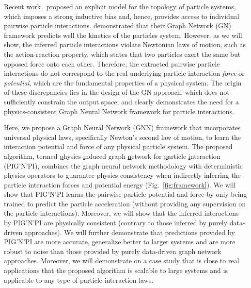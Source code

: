 \documentclass{article}
\newcommand{\pignpi}{PIG'N'PI\xspace}
\begin{document}
Recent work~\cite{cranmer2020discovering} proposed an explicit model for the topology of particle systems, which imposes a strong inductive bias and, hence, provides access to individual pairwise particle interactions. \cite{cranmer2020discovering} demonstrated that their Graph Network (GN) framework predicts well the kinetics of the particles system. However, as we will show, the inferred particle interactions violate Newtonian laws of motion, such as the action-reaction property, which states that two particles exert the same but opposed force onto each other. Therefore, the extracted pairwise particle interactions do not correspond to the real underlying particle interaction \emph{force} or \emph{potential}, which are the fundamental properties of a physical system. The origin of these discrepancies lies in the design of the GN approach, which does not sufficiently constrain the output space, and clearly demonstrates the need for a physics-consistent Graph Neural Network framework for particle interactions.

Here, we propose a Graph Neural Network (GNN) framework that incorporates universal physical laws, specifically Newton's second law of motion, to learn the interaction potential and force of any physical particle system. The proposed algorithm, termed \underline{p}hysics-\underline{i}nduced \underline{g}raph \underline{n}etwork for \underline{p}article \underline{i}nteraction (\pignpi), combines the graph neural network methodology with deterministic physics operators to guarantee physics consistency when indirectly inferring the particle interaction forces and potential energy (Fig.~\ref{fig:framework}). We will show that \pignpi learns the pairwise particle potential and force by only being trained to predict the particle acceleration  (without providing any supervision on the particle interactions). Moreover, we will  show that the inferred interactions by \pignpi are physically consistent (contrary to those inferred by purely data-driven approaches). We will further demonstrate that predictions provided by \pignpi are more accurate, generalize better to larger systems and are more robust to noise than those provided by purely data-driven graph network approaches. Moreover, we will demonstrate on a case study that is close to real applications that the proposed algorithm is scalable to large systems and is applicable to any type of particle interaction laws. 
\end{document}
